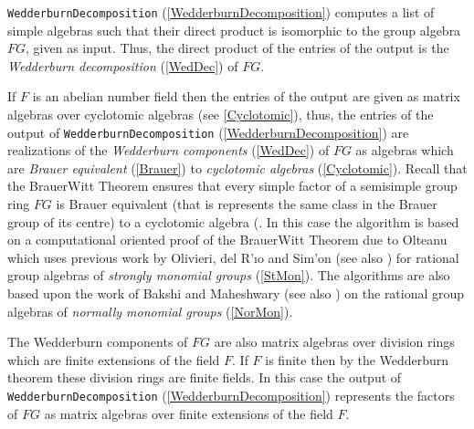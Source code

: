 \documentclass[a4paper,11pt]{report}
\begin{document}
{{ \texttt{WedderburnDecomposition} (\ref{WedderburnDecomposition}) computes a list of simple algebras such that their direct product is
isomorphic to the group algebra $FG$, given as input. Thus, the direct product of the entries of the output is the \emph{Wedderburn decomposition} (\ref{WedDec}) of $FG$. 

 If $F$ is an abelian number field then the entries of the output are given as matrix
algebras over cyclotomic algebras (see \ref{Cyclotomic}), thus, the entries of the output of \texttt{WedderburnDecomposition} (\ref{WedderburnDecomposition}) are realizations of the \emph{Wedderburn components} (\ref{WedDec}) of $FG$ as algebras which are \emph{Brauer equivalent} (\ref{Brauer}) to \emph{cyclotomic algebras} (\ref{Cyclotomic}). Recall that the Brauer\texttt{}Witt Theorem ensures that every
simple factor of a semisimple group ring $FG$ is Brauer equivalent (that is represents the same class in the Brauer group of
its centre) to a cyclotomic algebra (\cite{Y}. In this case the algorithm is based on a computational oriented proof of the
Brauer\texttt{}Witt Theorem due to Olteanu \cite{O} which uses previous work by Olivieri, del R{\a'\i}o and Sim{\a'o}n \cite{ORS} (see also \cite{OR} ) for rational group algebras of \emph{strongly monomial groups} (\ref{StMon}). The algorithms are also based upon the work of Bakshi and Maheshwary \cite{BM14} (see also \cite{BM16}) on the rational group algebras of \emph{normally monomial groups} (\ref{NorMon}).

 The Wedderburn components of $FG$ are also matrix algebras over division rings which are finite extensions of
the field $F$. If $F$ is finite then by the Wedderburn theorem these division rings are finite
fields. In this case the output of \texttt{WedderburnDecomposition} (\ref{WedderburnDecomposition}) represents the factors of $FG$ as matrix algebras over finite extensions of the field $F$. 

}}
\end{document}
